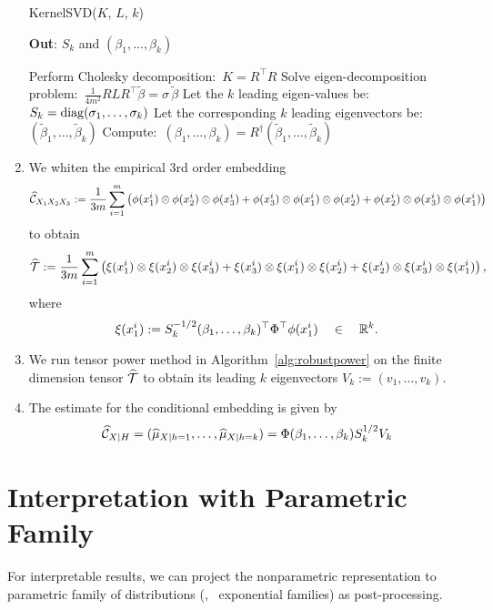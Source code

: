 \documentclass{article}
\begin{document}
\begin{enumerate}
\begin{algorithm}[t!]
\caption{KernelSVD($K$, $L$, $k$)}
	\textbf{Out}: $S_k$ and $(\beta_1,\ldots,\beta_k)$\\[-0.4cm]
  \begin{algorithmic}[1]
    \STATE Perform Cholesky decomposition:\ $K=R^\top R$
    \STATE Solve eigen-decomposition problem:\ $\frac{1}{4m^2} R L R^\top \widetilde{\beta} = \sigma\,\widetilde{\beta}$
    \STATE Let the $k$ leading eigen-values be:\ $S_k = \mathop{\mathrm{diag}}(\sigma_1,\ldots,\sigma_k)$
    \STATE Let the corresponding $k$ leading eigenvectors be:\ $(\widetilde{\beta}_1,\ldots,\widetilde{\beta}_k)$
    \STATE Compute:\ $(\beta_1,\ldots,\beta_k) = R^\dagger (\widetilde{\beta}_1,\ldots,\widetilde{\beta}_k)$
  \end{algorithmic}
  \label{alg:svd}
\end{algorithm}

\item We whiten the empirical 3rd order embedding
$$
  \widehat {\mathcal{C}}_{X_1 X_2 X_3}:=\frac{1}{3m}\sum_{i=1}^{m} \left(\phi(x_1^i) \otimes \phi(x_2^i) \otimes \phi(x_3^i) + \phi(x_3^i) \otimes \phi(x_1^i) \otimes \phi(x_2^i) + \phi(x_2^i) \otimes \phi(x_3^i) \otimes \phi(x_1^i)\right)
$$
to obtain
\begin{align}
  \widehat {{\mathcal{T}}} := \frac{1}{3m}\sum_{i=1}^m \left(\xi(x_1^i) \otimes \xi(x_2^i) \otimes \xi(x_3^i) + \xi(x_3^i) \otimes \xi(x_1^i) \otimes \xi(x_2^i) + \xi(x_2^i) \otimes \xi(x_3^i) \otimes \xi(x_1^i)\right),
\end{align}
where
$$
	\xi(x_1^i) := S_k^{-1/2} (\beta_1,\ldots,\beta_k)^\top \Phi^\top \phi(x_1^i)\quad \in \quad \mathbb{R}^k.
$$

\item We run tensor power method in Algorithm~\ref{alg:robustpower} on the finite dimension tensor $\widehat {{\mathcal{T}}}$ to obtain its leading $k$ eigenvectors $V_k:=(v_1,\ldots,v_k)$.

\item The estimate for the conditional embedding is given by
\begin{align}
  \widehat {\mathcal{C}}_{X|H} = (\widehat \mu_{X|h=1},\ldots, \widehat \mu_{X|h=k}) = \Phi (\beta_1,\ldots,\beta_k) S_k^{1/2} V_k
\end{align}

\end{enumerate}

\section{Interpretation with Parametric Family}

For interpretable results, we can project the nonparametric representation to parametric family of distributions (\eg, \, exponential families) as post-processing.





\end{document}
